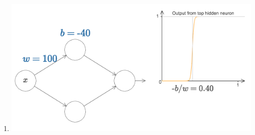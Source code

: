 \documentclass[12pt]{article}
\begin{document}
\begin{enumerate}

\item
\includegraphics[scale=0.5]{universality-1a}


\end{enumerate}
\end{document}
